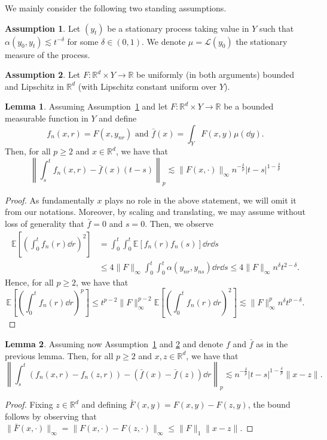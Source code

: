 \documentclass[]{article}
\theoremstyle{definition}
\newtheorem{assumption}{Assumption}
\theoremstyle{definition}
\newtheorem{lemma}{Lemma}
\begin{document}
We mainly consider the following two standing assumptions.

\begin{assumption}\label{as:1}
  Let \((y_t)\) be a stationary process taking value in \(Y\) such that \(\alpha(y_0, y_t) \lesssim t^{- \delta}\) 
  for some \(\delta \in (0, 1)\). We denote \(\mu = \mathcal{L}(y_0)\) the stationary measure of the process.
\end{assumption}

\begin{assumption}\label{as:2}
  Let \(F : \mathbb{R}^d \times Y \to \mathbb{R}\) be uniformly (in both arguments) bounded and Lipschitz 
  in \(\mathbb{R}^d\) (with Lipschitz constant uniform over \(Y\)).
\end{assumption}

\begin{lemma}
  Assuming Assumption~\ref{as:1} and let \(F : \mathbb{R}^d \times Y \to \mathbb{R}\) be a bounded 
  measurable function in \(Y\) and define 
  \[f_n(x, r) = F(x, y_{nr}) \text{ and } \bar f(x) = \int_Y F(x, y) \mu(\dd y).\]
  Then, for all \(p \ge 2\) and \(x \in \mathbb{R}^d\), we have that 
  \[\left\|\int_s^t f_n(x, r) - \bar f(x)(t - s)\right\|_p \lesssim 
    \|F(x, \cdot)\|_\infty n^{-\frac{\delta}{p}}|t - s|^{1 - \frac{\delta}{p}}\]
\end{lemma}
\begin{proof}
  As fundamentally \(x\) plays no role in the above statement, we will omit it from our notations. 
  Moreover, by scaling and translating, we may assume without loss of generality that \(\bar f = 0\) 
  and \(s = 0\). Then, we observe 
  \begin{align*}
    \mathbb{E}\left[\left(\int_0^t f_n(r) \dd r\right)^2\right] 
    & = \int_0^t \int_0^t \mathbb{E}[f_n(r) f_n(s)] \dd r \dd s\\
    & \le 4 \|F\|_\infty \int_0^t \int_0^t \alpha(y_{nr}, y_{ns}) \dd r \dd s
      \le 4 \|F\|_\infty n^\delta t^{2 - \delta}.
  \end{align*}
  Hence, for all \(p \ge 2\), we have that 
  \[\mathbb{E}\left[\left(\int_0^t f_n(r) \dd r\right)^p\right] 
    \le t^{p - 2} \|F\|_\infty^{p - 2} \mathbb{E}\left[\left(\int_0^t f_n(r) \dd r\right)^2\right]
    \lesssim \|F\|_\infty^p n^\delta t^{p - \delta}.\]
\end{proof}

\begin{lemma}
  Assuming now Assumption~\ref{as:1} and \ref{as:2} and denote \(f\) and \(\bar f\) as in the previous 
  lemma. Then, for all \(p \ge 2\) and \(x, z \in \mathbb{R}^d\), we have that
  \[\left\|\int_s^t (f_n(x, r) - f_n(z, r)) - (\bar f(x) - \bar f(z)) \dd r\right\|_p 
    \lesssim n^{-\frac{\delta}{p}} |t - s|^{1 - \frac{\delta}{p}} \|x - z\|.\]
\end{lemma}
\begin{proof}
  Fixing \(z \in \mathbb{R}^d\) and defining \(\bar F(x, y) = F(x, y) - F(z, y)\), the bound follows 
  by observing that \(\|\bar F(x, \cdot)\|_\infty = \|F(x, \cdot) - F(z, \cdot)\|_\infty \le \|F\|_1 \|x - z\|\).
\end{proof}
\end{document}
